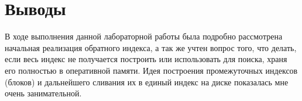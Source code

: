 \section{Выводы}
В ходе выполнения данной лабораторной работы была подробно рассмотрена начальная реализация обратного индекса, а так же учтен вопрос того, что делать, если весь индекс не получается построить или использовать для поиска, храня его полностью в оперативной памяти. Идея построения промежуточных индексов (блоков) и дальнейшего сливания их в единый индекс на диске показалась мне очень занимательной.

\pagebreak
